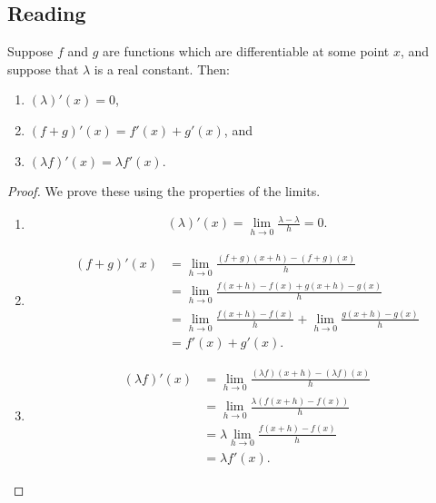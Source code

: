 


\subsection*{Reading}

\begin{thm}
  Suppose $ f $ and $ g $ are functions which are differentiable at some point $ x $, and
  suppose that $ \lambda $ is a real constant. Then:
  \begin{enumerate}
    \item $ (\lambda)'(x) = 0 $,
    \item $ (f + g)'(x) = f'(x) + g'(x) $, and
    \item $ (\lambda f)'(x) = \lambda f'(x) $.
  \end{enumerate}
\end{thm}

\begin{proof}
  We prove these using the properties of the limits.
  \begin{enumerate}
    \item\begin{align*}
      (\lambda)'(x) = \lim_{h \to 0} \frac{\lambda - \lambda}{h} = 0.
    \end{align*}
    \item\begin{align*}
      (f + g)'(x) &= \lim_{h \to 0} \frac{(f + g)(x + h) - (f + g)(x)}{h}\\
                  &= \lim_{h \to 0} \frac{f(x + h) - f(x) + g(x + h) - g(x)}{h}\\
                  &= \lim_{h \to 0} \frac{f(x + h) - f(x)}{h} + \lim_{h \to 0} \frac{g(x + h) - g(x)}{h}\\
                  &= f'(x) + g'(x).
    \end{align*}
    \item\begin{align*}
      (\lambda f)'(x) &= \lim_{h \to 0} \frac{(\lambda f)(x + h) - (\lambda f)(x)}{h}\\
                      &= \lim_{h \to 0} \frac{\lambda (f(x + h) - f(x))}{h}\\
                      &= \lambda \lim_{h \to 0} \frac{f(x + h) - f(x)}{h}\\
                      &= \lambda f'(x).
    \end{align*}
  \end{enumerate}
\end{proof}

